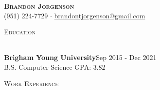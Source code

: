 \documentclass[letterpaper]{article}
\newcommand{\lineunder} {
    \vspace*{-8pt} \\
    \hspace*{-18pt} \hrulefill \\
}
\newcommand{\header} [1] {
    {\hspace*{-18pt}\vspace*{6pt} \textsc{#1}}
    \vspace*{-6pt} \lineunder
    \vspace{1mm}
}
\begin{document}
\vspace*{-40pt}

\vspace*{-10pt}
\begin{center}
	{\Huge \scshape \textbf {Brandon Jorgenson}}\\
    \vspace{1mm}
	(951) 224-7729 $\cdot$ \href{mailto:brandontjorgenson@gmail.com}{brandontjorgenson@gmail.com}\\
\end{center}

\header{Education}
\textbf{Brigham Young University}\hfill Sep 2015 - Dec 2021\\
\vspace{.5mm}
B.S. Computer Science  \hfill {GPA: 3.82}\\
\vspace{2mm}

\header{Work Experience}
\end{document}
